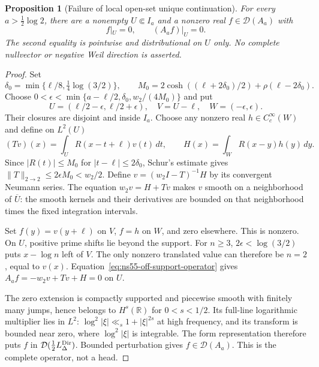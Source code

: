 \documentclass[11pt]{article}
\newtheorem{proposition}[theorem]{Proposition}
\theoremstyle{remark}
\begin{document}
\begin{proposition}[Failure of local open-set unique continuation]
\label{prop:ns55-local-ucp-counterexample}
For every $a>\tfrac12\log2$, there are a nonempty $U\Subset I_a$
and a nonzero real $f\in\mathcal D(A_a)$ with
\[
 f|_U=0,\qquad (A_af)|_U=0.
\]
The second equality is pointwise and distributional on $U$ only.
No complete nullvector or negative Weil direction is asserted.
\end{proposition}
\begin{proof}
Set
\[
 \delta_0=\min\{\ell/8,\tfrac14\log(3/2)\},\qquad
 M_0=2\cosh((\ell+2\delta_0)/2)+\rho(\ell-2\delta_0).
\]
Choose $0<\epsilon<\min\{a-\ell/2,\delta_0,w_2/(4M_0)\}$ and put
\[
 U=(\ell/2-\epsilon,\ell/2+\epsilon),\quad V=U-\ell,\quad
 W=(-\epsilon,\epsilon).
\]
Their closures are disjoint and inside $I_a$. Choose any nonzero real
$h\in C_c^\infty(W)$ and define on $L^2(U)$
\[
 (Tv)(x)=\int_U R(x-t+\ell)v(t)\,dt,\qquad
 H(x)=\int_W R(x-y)h(y)\,dy .
\]
Since $|R(t)|\le M_0$ for $|t-\ell|\le2\delta_0$, Schur's estimate
gives $\|T\|_{2\to2}\le2\epsilon M_0<w_2/2$. Define
$v=(w_2I-T)^{-1}H$ by its convergent Neumann series. The equation
$w_2v=H+Tv$ makes $v$ smooth on a neighborhood of $\overline U$:
the smooth kernels and their derivatives are bounded on that
neighborhood times the fixed integration intervals.

Set $f(y)=v(y+\ell)$ on $V$, $f=h$ on $W$, and zero elsewhere.
This is nonzero. On $U$, positive prime shifts lie beyond the support.
For $n\ge3$, $2\epsilon<\log(3/2)$ puts $x-\log n$ left of $V$.
The only nonzero translated value can therefore be $n=2$, equal to
$v(x)$. Equation~\eqref{eq:ns55-off-support-operator} gives
$A_af=-w_2v+Tv+H=0$ on $U$.

The zero extension is compactly supported and piecewise smooth with
finitely many jumps, hence belongs to $H^s(\mathbb R)$ for
$0<s<1/2$. Its full-line logarithmic multiplier lies in $L^2$:
$\log^2|\xi|\ll_s1+|\xi|^{2s}$ at high frequency, and its transform
is bounded near zero, where $\log^2|\xi|$ is integrable. The form
representation therefore puts $f$ in
$\mathcal D(\tfrac12L_\Delta^{\rm Dir})$. Bounded perturbation
gives $f\in\mathcal D(A_a)$. This is the complete operator, not a head.
\end{proof}
\end{document}
